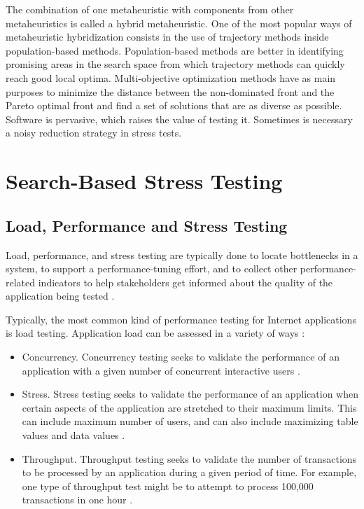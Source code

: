 \documentclass[espaco=umemeio,chapter=TITLE,twoside,openright]{abnt}
\begin{document}
The combination of one metaheuristic with components from other metaheuristics is called a hybrid metaheuristic. One of the most popular ways of metaheuristic hybridization consists in the use of trajectory methods inside population-based methods. Population-based methods are better in identifying promising areas in the search space from which trajectory methods can quickly reach good local optima. Multi-objective optimization methods have as main purposes to minimize the distance between the non-dominated front and the Pareto optimal front and find a set of solutions that are as diverse as possible. Software is pervasive, which raises the value of testing it. Sometimes is necessary a noisy reduction strategy in stress tests.


\chapter{Search-Based Stress Testing}


\section{Load, Performance and Stress Testing}

Load, performance, and stress testing are typically done to locate bottlenecks in a system, to support a performance-tuning effort, and to collect other performance-related indicators to help stakeholders get informed about the quality of the application being tested \cite{Sandler2004} \cite{Corporation2007}.

Typically, the most common kind of performance testing for Internet applications is load testing. Application load can be assessed in a variety of ways \cite{Perry2004}:

\begin{itemize}
\item Concurrency. Concurrency testing seeks to validate the performance of an application with a given number of concurrent interactive users \cite{Perry2004}.
\item Stress. Stress testing seeks to validate the performance of an application when certain aspects of the application are stretched to their maximum limits. This can include maximum number of users, and can also include maximizing table values and data values \cite{Perry2004}.
\item Throughput. Throughput testing seeks to validate the number of transactions to be processed by an application during a given period of time. For example, one type of throughput test might be to attempt to process 100,000 transactions in one hour \cite{Perry2004}.
\end{itemize}
\end{document}
